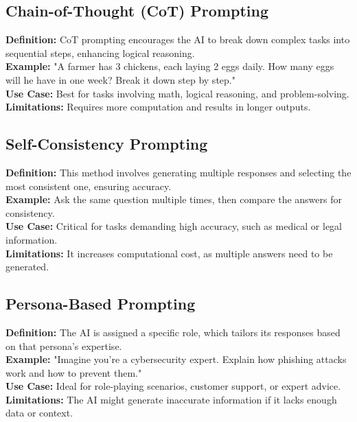 \subsection{Chain-of-Thought (CoT) Prompting}
\textbf{Definition:} CoT prompting encourages the AI to break down complex tasks into sequential steps, enhancing logical reasoning. \\
\textbf{Example:} "A farmer has 3 chickens, each laying 2 eggs daily. How many eggs will he have in one week? Break it down step by step." \\
\textbf{Use Case:} Best for tasks involving math, logical reasoning, and problem-solving. \\
\textbf{Limitations:} Requires more computation and results in longer outputs. \cite{wei2022chain}

\subsection{Self-Consistency Prompting}
\textbf{Definition:} This method involves generating multiple responses and selecting the most consistent one, ensuring accuracy. \\
\textbf{Example:} Ask the same question multiple times, then compare the answers for consistency. \\
\textbf{Use Case:} Critical for tasks demanding high accuracy, such as medical or legal information. \\
\textbf{Limitations:} It increases computational cost, as multiple answers need to be generated. \cite{wang2022self}

\subsection{Persona-Based Prompting}
\textbf{Definition:} The AI is assigned a specific role, which tailors its responses based on that persona’s expertise. \\
\textbf{Example:} "Imagine you're a cybersecurity expert. Explain how phishing attacks work and how to prevent them." \\
\textbf{Use Case:} Ideal for role-playing scenarios, customer support, or expert advice. \\
\textbf{Limitations:} The AI might generate inaccurate information if it lacks enough data or context. \cite{zhao2021taxonomy}

